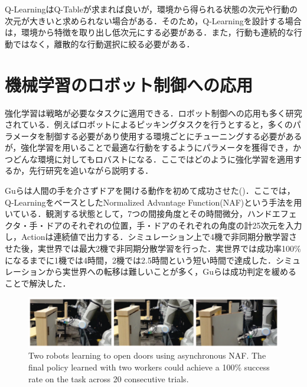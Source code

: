 Q-LearningはQ-Tableが求まれば良いが，環境から得られる状態の次元や行動の次元が大きいと求められない場合がある．そのため，Q-Learningを設計する場合は，環境から特徴を取り出し低次元にする必要がある．また，行動も連続的な行動ではなく，離散的な行動選択に絞る必要がある．


\section{機械学習のロボット制御への応用}
強化学習は戦略が必要なタスクに適用できる．ロボット制御への応用も多く研究されている．例えばロボットによるピッキングタスクを行うとすると，多くのパラメータを制御する必要があり使用する環境ごとにチューニングする必要があるが，強化学習を用いることで最適な行動をするようにパラメータを獲得でき，かつどんな環境に対してもロバストになる．ここではどのように強化学習を適用するか，先行研究を追いながら説明する．

Guらは人間の手を介さずドアを開ける動作を初めて成功させた\cite{Gu2017}()．ここでは，Q-LearningをベースとしたNormalized Advantage Function(NAF)という手法\cite{NAF}を用いている．観測する状態として，7つの間接角度とその時間微分，ハンドエフェクタ・手・ドアのそれぞれの位置，手・ドアのそれぞれの角度の計25次元を入力し，Actionは連続値で出力する．シミュレーション上で4機で非同期分散学習させた後，実世界では最大2機で非同期分散学習を行った．実世界では成功率100\%になるまでに1機では4時間，2機では2.5時間という短い時間で達成した．シミュレーションから実世界への転移は難しいことが多く，Guらは成功判定を緩めることで解決した．
\begin{figure}
    \centering
    \includegraphics[width=\linewidth]{figure/chapter2/Gu}
    \caption[Two robots learning to open doors using asynchronous NAF. The final policy learned with two workers could achieve a 100\% success rate on the task across 20 consecutive trials.]{Two robots learning to open doors using asynchronous NAF. The final policy learned with two workers could achieve a 100\% success rate on the task across 20 consecutive trials\cite{Gu2017}.}
    \label{fig:Gu}
\end{figure}

